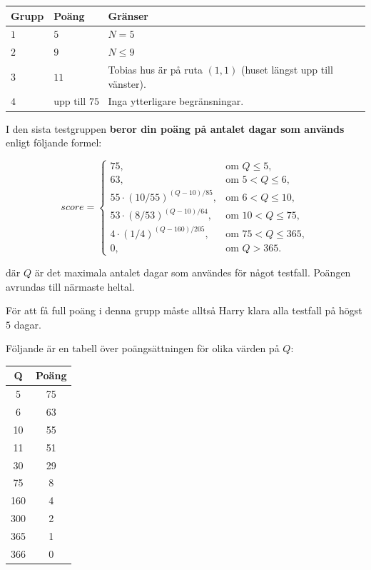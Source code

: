 \noindent
\begin{tabular}{| l | l | p{12cm} |}
  \hline
  \textbf{Grupp} & \textbf{Poäng} & \textbf{Gränser} \\ \hline
  $1$    & $5$        & $N = 5$ \\ \hline
  $2$    & $9$        & $N \leq 9$ \\ \hline
  $3$    & $11$       & Tobias hus är på ruta $(1,1)$ (huset längst upp till vänster). \\ \hline
  $4$    & $\text{upp till } 75$     & Inga ytterligare begränsningar. \\ \hline
\end{tabular}

I den sista testgruppen \textbf{beror din poäng på antalet dagar som används} enligt följande formel:

\[
score =
\begin{cases}
75, & \text{om } Q \le 5,\\
63, & \text{om } 5 < Q \le 6,\\
55 \cdot \left( 10/55 \right)^{ (Q-10)/85}, & \text{om } 6 < Q \le 10,\\
53 \cdot \left( 8/53 \right)^{ (Q-10)/64}, & \text{om } 10 < Q \le 75,\\
4 \cdot \left(1/4\right)^{ (Q-160)/205}, & \text{om } 75 < Q \le 365,\\
0, & \text{om } Q > 365.
\end{cases}
\]

där $Q$ är det maximala antalet dagar som användes för något testfall. Poängen avrundas till närmaste heltal.

För att få full poäng i denna grupp måste alltså Harry klara alla testfall på högst $5$ dagar.

Följande är en tabell över poängsättningen för olika värden på $Q$:
\begin{table}[h!]
\centering
\begin{tabular}{c|c}
\textbf{Q} & \textbf{Poäng} \\
\hline
5   & 75 \\
6   & 63 \\
10  & 55 \\
11  & 51 \\
30  & 29 \\
75  & 8 \\
160 & 4 \\
300 & 2 \\
365 & 1 \\
366 & 0 \\
\end{tabular}
\end{table}

